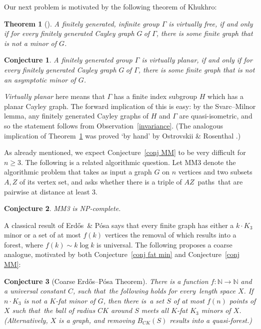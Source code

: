 \documentclass[a4paper]{article}
\newcommand{\defi}[1]{{\color{darkgray}\emph{#1}}}
\newtheorem{theorem}[proposition]{Theorem}
\newtheorem{conjecture}{{Conjecture}}[section]
\newcommand{\N}{\ensuremath{\mathbb N}}
\newcommand{\pths}[2]{\ensuremath{#1}\text{--}\ensuremath{#2}~paths}
\newcommand{\g}{\ensuremath{G\ }}
\newcommand{\G}{\ensuremath{G}}
\newcommand{\Cg}{Cayley graph}
\newcommand{\Tr}[1]{Theorem~\ref{#1}}
\newcommand{\Cnr}[1]{Con\-jecture~\ref{#1}}
\newcommand{\Or}[1]{Observation~\ref{#1}}
\newcommand{\fe}{for every}
\newcommand{\st}{such that}
\newcommand{\ti}{there is}
\newcommand{\Erd}{Erd\H{o}s}
\begin{document}
Our next problem is motivated by the following theorem of Khukhro: 
\begin{theorem}[\cite{KhuCha}] \label{Khukhro}
A finitely generated, infinite group $\Gamma$ is virtually free, if and only if for every finitely generated Cayley graph \g of $\Gamma$, there is some finite graph that is not a minor of \G.
\end{theorem}

\begin{conjecture} \label{virt planar}
A finitely generated group $\Gamma$ is virtually planar, if and only if for every finitely generated Cayley graph \g of $\Gamma$, there is some finite graph that is not an asymptotic minor of \G. 
\end{conjecture}
\defi{Virtually planar} here means that $\Gamma$ has a finite index subgroup $H$ which has a planar \Cg.  The forward implication of this is easy: by the Svarc--Milnor lemma, any finitely generated \Cg s of  $H$ and $\Gamma$
 are quasi-isometric, and so the statement follows from \Or{invariance}. (The analogous implication of \Tr{Khukhro} was proved `by hand' by Ostrovskii \& Rosenthal \cite{OstRosMet}.)

\medskip
As already mentioned, we expect \Cnr{conj MM} to be very difficult for $n\geq 3$. The following is a related algorithmic question. Let MM3 denote the algorithmic problem that takes as input a graph $G$ on $n$ vertices and two subsets  $A,Z$ of its vertex set, and asks whether there is a triple of \pths{A}{Z}\ that are pairwise at distance at least 3. 
\begin{conjecture} \label{conj MM NPc}
MM3 is NP-complete.
\end{conjecture}



A classical result of \Erd\ \& P\'osa \cite{ErdPosInd} says that every finite graph has either a $k\cdot K_3$ minor or a set of at most $f(k)$ vertices the removal of which results into a forest, where $f(k) \sim k \log k$ is universal. The following proposes a coarse analogue, motivated by both \Cnr{conj fat min} and \Cnr{conj MM}:

\begin{conjecture}[Coarse \Erd--P\'osa Theorem] \label{Cnr EP}
 There is a function $f: \N \to \N$ and a universal constant $C$, \st\ the following holds \fe\ length space  $X$.
If $n \cdot K_3$ is not a $K$-fat minor of $G$, then \ti\ a set $S$ of at most $f(n)$ points of $X$ \st\ the ball of radius $C K$ around $S$ meets all $K$-fat $K_3$ minors of $X$. (Alternatively, $X$ is a graph, and removing $B_{CK}(S)$ results into a quasi-forest.)
\end{conjecture}
\end{document}

